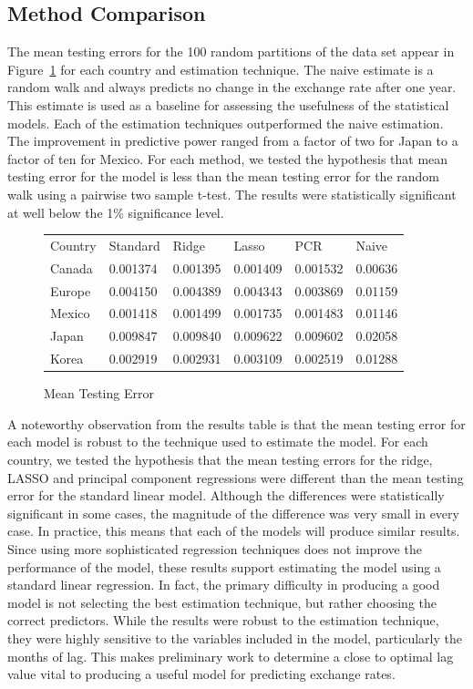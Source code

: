 \documentclass{sig-alternate-05-2015}
\begin{document}
\subsection{Method Comparison}

The mean testing errors for the 100 random partitions of the data set appear in Figure~\ref{tab:comparison} for each country and estimation technique. The naive estimate is a random walk and always predicts no change in the exchange rate after one year. This estimate is used as a baseline for assessing the usefulness of the statistical models. Each of the estimation techniques outperformed the naive estimation. The improvement in predictive power ranged from a factor of two for Japan to a factor of ten for Mexico. For each method, we tested the hypothesis that mean testing error for the model is less than the mean testing error for the random walk using a pairwise two sample t-test. The results were statistically significant at well below the 1\% significance level.

\begin{figure}
\centering
\caption{Mean Testing Error}
\begin{tabular}{l l l l l l}
Country	& Standard 	& Ridge 		& Lasso 		& PCR 		& Naive \\
Canada 	& 0.001374 	& 0.001395 	& 0.001409 	& 0.001532 	& 0.00636 \\
Europe	& 0.004150 	& 0.004389 	& 0.004343 	& 0.003869 	& 0.01159 \\
Mexico	& 0.001418 	& 0.001499 	& 0.001735 	& 0.001483  & 0.01146 \\
Japan	& 0.009847 	& 0.009840 	& 0.009622 	& 0.009602  & 0.02058 \\
Korea	& 0.002919 	& 0.002931 	& 0.003109 	& 0.002519 	& 0.01288 \\
\end{tabular}
\label{tab:comparison}
\end{figure}

\par{} A noteworthy observation from the results table is that the mean testing error for each model is robust to the technique used to estimate the model. For each country, we tested the hypothesis that the mean testing errors for the ridge, LASSO and principal component regressions were different than the mean testing error for the standard linear model. Although the differences were statistically significant in some cases, the magnitude of the difference was very small in every case. In practice, this means that each of the models will produce similar results. Since using more sophisticated regression techniques does not improve the performance of the model, these results support estimating the model using a standard linear regression. In fact, the primary difficulty in producing a good model is not selecting the best estimation technique, but rather choosing the correct predictors. While the results were robust to the estimation technique, they were highly sensitive to the variables included in the model, particularly the months of lag. This makes preliminary work to determine a close to optimal lag value vital to producing a useful model for predicting exchange rates.
\end{document}
